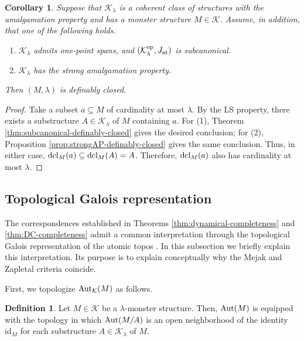 \documentclass[10pt]{amsart}
\numberwithin{equation}{section}
\theoremstyle{plain}
\newtheorem{cor}[theorem]{Corollary}
\theoremstyle{definition}
\newtheorem{definition}[theorem]{Definition}
\newcommand{\K}{\mathcal{K}}
\begin{document}
\begin{cor}
Suppose that $\K_\lambda$ is a coherent class of structures with the amalgamation property and has a monster structure $M\in\K$.
Assume, in addition, that one of the following holds.
\begin{enumerate}
\item $\K_\lambda$ admits one-point spans, and $(\K_\lambda^{\rm op},J_{\rm at})$ is subcanonical.
\item $\K_\lambda$ has the strong amalgamation property.
\end{enumerate}

%
%
Then $(M,\lambda)$ is definably closed.
\end{cor}

\begin{proof}
Take a subset $a\subseteq M$ of cardinality at most $\lambda$.
By the LS property, there exists a substructure $A\in\K_\lambda$ of $M$ containing $a$.
For (1), Theorem \ref{thm:subcanonical-definably-closed} gives the desired conclusion; for (2), Proposition \ref{prop:strongAP-definably-closed} gives the same conclusion. Thus, in either case, ${\rm dcl}_M(a)\subseteq{\rm dcl}_M(A)=A$.
Therefore, ${\rm dcl}_M(a)$ also has cardinality at most $\lambda$.
\end{proof}


\subsection{Topological Galois representation}

The correspondences established in Theorems \ref{thm:dynamical-completeness} and \ref{thm:DC-completeness} admit a common interpretation through the topological Galois representation of the atomic topos \cite{Car16,CaLa19}.
In this subsection we briefly explain this interpretation.
Its purpose is to explain conceptually why the Mejak and Zapletal criteria coincide.

%
First, we topologize ${\rm Aut}_\K(M)$ as follows.

\begin{definition}
Let $M\in\K$ be a $\lambda$-monster structure.
Then, ${\rm Aut}(M)$ is equipped with the topology in which ${\rm Aut}(M/A)$ is an open neighborhood of the identity $\text{id}_M$ for each substructure $A\in\K_\lambda$ of $M$.
\end{definition}
\end{document}
